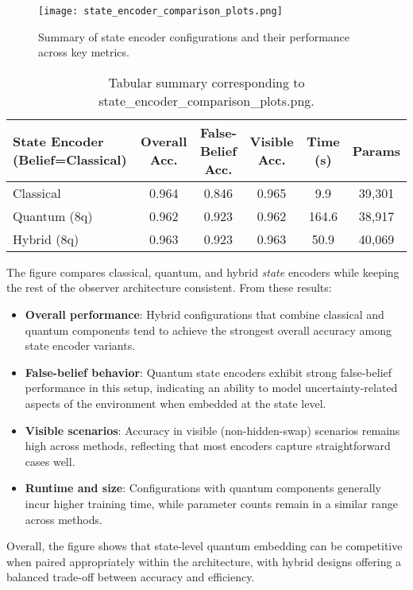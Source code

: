 \documentclass[11pt]{article}
\begin{document}
\begin{figure}[h]
\centering
\texttt{[image: state\_encoder\_comparison\_plots.png]}
\caption{Summary of state encoder configurations and their performance across key metrics.}
\end{figure}

\begin{table}[h]
\centering
\begin{tabular}{lccccc}
\toprule
\textbf{State Encoder (Belief=Classical)} & \textbf{Overall Acc.} & \textbf{False-Belief Acc.} & \textbf{Visible Acc.} & \textbf{Time (s)} & \textbf{Params} \\
\midrule
Classical & 0.964 & 0.846 & 0.965 & 9.9 & 39,301 \\
Quantum (8q) & 0.962 & 0.923 & 0.962 & 164.6 & 38,917 \\
Hybrid (8q) & 0.963 & 0.923 & 0.963 & 50.9 & 40,069 \\
\bottomrule
\end{tabular}
\caption{Tabular summary corresponding to state\_encoder\_comparison\_plots.png.}
\end{table}

The figure compares classical, quantum, and hybrid \emph{state} encoders while keeping the rest of the observer architecture consistent. From these results:
\begin{itemize}
    \item \textbf{Overall performance}: Hybrid configurations that combine classical and quantum components tend to achieve the strongest overall accuracy among state encoder variants.
    \item \textbf{False-belief behavior}: Quantum state encoders exhibit strong false-belief performance in this setup, indicating an ability to model uncertainty-related aspects of the environment when embedded at the state level.
    \item \textbf{Visible scenarios}: Accuracy in visible (non-hidden-swap) scenarios remains high across methods, reflecting that most encoders capture straightforward cases well.
    \item \textbf{Runtime and size}: Configurations with quantum components generally incur higher training time, while parameter counts remain in a similar range across methods.
\end{itemize}

Overall, the figure shows that state-level quantum embedding can be competitive when paired appropriately within the architecture, with hybrid designs offering a balanced trade-off between accuracy and efficiency.
\end{document}
